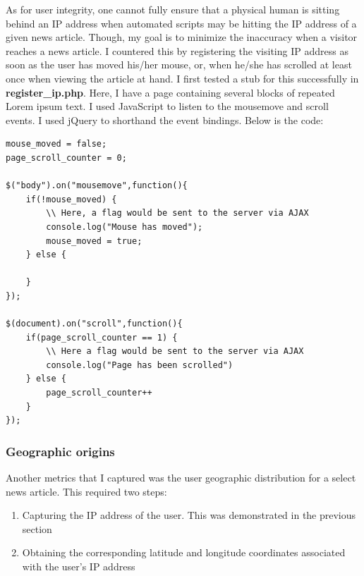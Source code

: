 \documentclass[12pt]{article}
\begin{document}
As for user integrity, one cannot fully ensure that a physical human is sitting behind an IP address when automated scripts may be hitting the IP address of a given news article. Though, my goal is to minimize the inaccuracy when a visitor reaches a news article. I countered this by registering the visiting IP address as soon as the user has moved his/her mouse, or, when he/she has scrolled at least once when viewing the article at hand. I first tested a stub for this successfully in \textbf{register\_ip.php}. Here, I have a page containing several blocks of repeated Lorem ipsum text. I used JavaScript to listen to the mousemove and scroll events. I used jQuery to shorthand the event bindings. Below is the code:
\begin{lstlisting}[basicstyle=\scriptsize]
mouse_moved = false;
page_scroll_counter = 0;

$("body").on("mousemove",function(){
	if(!mouse_moved) {
		\\ Here, a flag would be sent to the server via AJAX
		console.log("Mouse has moved");
		mouse_moved = true;
	} else {
		
	}
});

$(document).on("scroll",function(){
	if(page_scroll_counter == 1) {
		\\ Here a flag would be sent to the server via AJAX
		console.log("Page has been scrolled")
	} else {
		page_scroll_counter++
	}
});
\end{lstlisting}        

\newpage

\subsubsection{Geographic origins}
Another metrics that I captured was the user geographic distribution for a select news article. This required two steps:
\begin{enumerate}
\item Capturing the IP address of the user. This was demonstrated in the previous section
\item Obtaining the corresponding latitude and longitude coordinates associated with the user's IP address
\end{enumerate}
\end{document}
